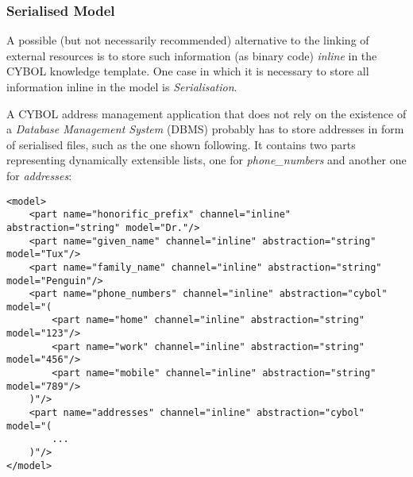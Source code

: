 %
%
%
%
%
%
%

\subsubsection{Serialised Model}
\label{serialised_model_heading}

A possible (but not necessarily recommended) alternative to the linking of
external resources is to store such information (as binary code) \emph{inline}
in the CYBOL knowledge template. One case in which it is necessary to store all
information inline in the model is \emph{Serialisation}.

A CYBOL address management application that does not rely on the existence of a
\emph{Database Management System} (DBMS) probably has to store addresses in
form of serialised files, such as the one shown following. It contains two
parts representing dynamically extensible lists, one for \emph{phone\_numbers}
and another one for \emph{addresses}:

\begin{scriptsize}
    \begin{verbatim}
<model>
    <part name="honorific_prefix" channel="inline" abstraction="string" model="Dr."/>
    <part name="given_name" channel="inline" abstraction="string" model="Tux"/>
    <part name="family_name" channel="inline" abstraction="string" model="Penguin"/>
    <part name="phone_numbers" channel="inline" abstraction="cybol" model="(
        <part name="home" channel="inline" abstraction="string" model="123"/>
        <part name="work" channel="inline" abstraction="string" model="456"/>
        <part name="mobile" channel="inline" abstraction="string" model="789"/>
    )"/>
    <part name="addresses" channel="inline" abstraction="cybol" model="(
        ...
    )"/>
</model>
    \end{verbatim}
\end{scriptsize}

